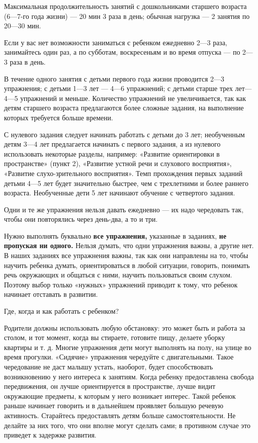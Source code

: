 \documentclass{book}
\begin{document}
Максимальная продолжительность занятий с дошкольниками старшего возраста
(6---7-го года жизни) --- 20 мин 3 раза в день; обычная нагрузка --- 2
занятия по 20---30 мин.

Если у вас нет возможности заниматься с ребенком ежедневно 2---3 раза,
занимайтесь один раз, а по субботам, воскресеньям и во время отпуска ---
по 2---3 раза в день.

В течение одного занятия с детьми первого года жизни проводится 2---3
упражнения; с детьми 1---3 лет --- 4---6 упражнений; с детьми старше
трех лет---4---5 упражнений и меньше. Количество упражнений не
увеличивается, так как детям старшего возраста предлагаются более
сложные задания, на выполнение которых требуется больше времени.

С нулевого задания следует начинать работать с детьми до 3 лет;
необученным детям 3---4 лет предлагается начинать с первого задания, а
из нулевого использовать некоторые разделы, например: «Развитие
ориентировки в пространстве» (пункт 2), «Развитие устной речи и
слухового восприятия», «Развитие слухо-зрительного восприятия». Темп
прохождения первых заданий детьми 4---5 лет будет значительно быстрее,
чем с трехлетними и более раннего возраста. Необученные дети 5 лет
начинают обучение с четвертого задания.

Одни и те же упражнения нельзя давать ежедневно --- их надо чередовать
так, чтобы они повторялись через день-два, а то и три.

Нужно выполнять буквально \textbf{все упражнения,} указанные в заданиях,
\textbf{не пропуская ни одного.} Нельзя думать, что одни упражнения
важны, а другие нет. В наших заданиях все упражнения важны, так как они
направлены на то, чтобы научить ребенка думать, ориентироваться в любой
ситуации, говорить, понимать речь окружающих и общаться с ними, научить
пользоваться своим слухом. Поэтому выбор только «нужных» упражнений
приводит к тому, что ребенок начинает отставать в развитии.

Где, когда и как работать с ребенком?

Родители должны использовать любую обстановку: это может быть и работа
за столом, и тот момент, когда вы стираете, готовите пищу, делаете
уборку квартиры и т. д. Многие упражнения дети могут выполнять на полу,
на улице во время прогулки. «Сидячие» упражнения чередуйте с
двигательными. Такое чередование не даст малышу устать, наоборот, будет
способствовать возникновению у него интереса к занятиям. Когда ребенку
предоставлена свобода передвижения, он лучше ориентируется в
пространстве, лучше видит окружающие предметы, к которым у него
возникает интерес. Такой ребенок раньше начинает говорить и в дальнейшем
проявляет большую речевую активность. Старайтесь предоставлять детям
больше самостоятельности. Не делайте за них того, что они вполне могут
сделать сами; в противном случае это приведет к задержке развития.
\end{document}
